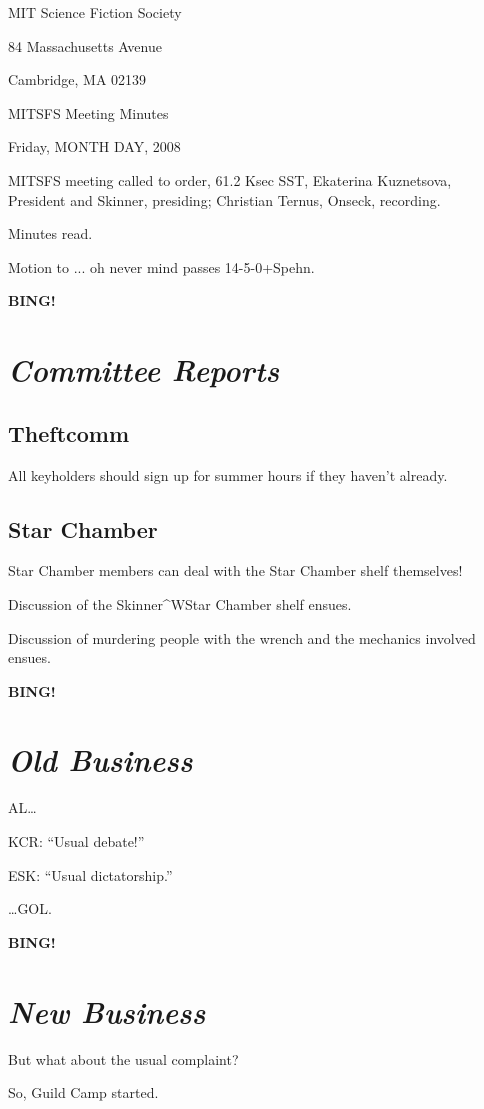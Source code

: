\documentclass[10pt]{article}
\newcommand{\bing}{{\bf BING!} }
\newcommand{\goto}[1]{\bing \vskip 12pt \section*{{\em{#1}}}}
\begin{document}
\begin{center}

MIT Science Fiction Society

84 Massachusetts Avenue

Cambridge, MA 02139

\vspace{12pt}

MITSFS Meeting Minutes

Friday, MONTH DAY, 2008

\end{center}

\vspace{18pt}

\setlength{\parskip}{6pt}

\noindent
MITSFS meeting called to order, 61.2 Ksec SST,
Ekaterina Kuznetsova, President and Skinner, presiding; Christian Ternus, Onseck, recording.

Minutes read.

Motion to ... oh never mind passes 14-5-0+Spehn.

\BING

\goto{Committee Reports}

\subsection*{Theftcomm}

All keyholders should sign up for summer hours if they haven't already.

\subsection*{Star Chamber}

Star Chamber members can deal with the Star Chamber shelf themselves!

Discussion of the Skinner^WStar Chamber shelf ensues.

Discussion of murdering people with the wrench and the mechanics involved ensues.

\goto{Old Business}


AL\ldots{}

KCR: ``Usual debate!''

ESK: ``Usual dictatorship.''

\ldots{}GOL.

\goto{New Business}

But what about the usual complaint?

So, Guild Camp started.
\end{document}
